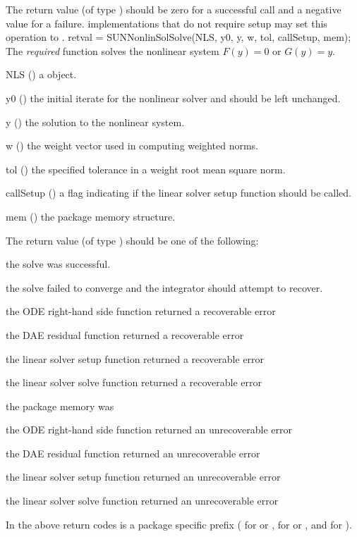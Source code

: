 {
  The return value  (of type ) should be zero for a
  successful call and a negative value for a failure.
}
{
  {\sunnonlinsol} implementations that do not require setup may set
  this operation to .
}
{
  retval = SUNNonlinSolSolve(NLS, y0, y, w, tol, callSetup, mem);
}
{
  The \textit{required} function  solves the
  nonlinear system $F(y)=0$ or $G(y)=y$.
}
{
  \begin{args}[callSetup]
  \item[NLS] ()
    a {\sunnonlinsol} object.
  \item[y0] ()
    the initial iterate for the nonlinear solver and should be left
    unchanged.
  \item[y] ()
    the solution to the nonlinear system.
  \item[w] ()
    the weight vector used in computing weighted norms.
  \item[tol] ()
    the specified tolerance in a weight root mean square norm.
  \item[callSetup] ()
    a flag indicating if the linear solver setup function should be
    called. 
  \item[mem] ()
    the {\sundials} package memory structure.
  \end{args}
}
{
  The return value  (of type ) should be one of the
  following:
  \begin{args}
  \item[\Id{SUN\_NLS\_SUCCESS}]
    the solve was successful.
  \item[\Id{SUN\_NLS\_CONV\_RECVR}]
    the solve failed to converge and the integrator should attempt to
    recover.
  \item[\id{*\_RHSFUNC\_RECVR}]
    the ODE right-hand side function returned a recoverable error
  \item[\id{*\_RES\_RECVR}]
    the DAE residual function returned a recoverable error
  \item[\id{*\_LSETUP\_RECVR}]
    the linear solver setup function returned a recoverable error
  \item[\id{*\_LSOLVE\_RECVR}]
    the linear solver solve function returned a recoverable error
  \item[\id{*\_MEM\_NULL}]
    the {\sundials} package memory was 
  \item[\id{*\_RHSFUNC\_FAIL}]
    the ODE right-hand side function returned an unrecoverable error
  \item[\id{*\_RES\_FAIL}]
    the DAE residual function returned an unrecoverable error
  \item[\id{*\_LSETUP\_FAIL}]
    the linear solver setup function returned an unrecoverable error
  \item[\id{*\_LSOLVE\_FAIL}]
    the linear solver solve function returned an unrecoverable error
  \end{args}
  In the above return codes \id{*} is a {\sundials} package specific
  prefix ( for {\cvode} or {\cvodes},  for {\ida} or
  {\idas}, and  for {\arkode}).
}
